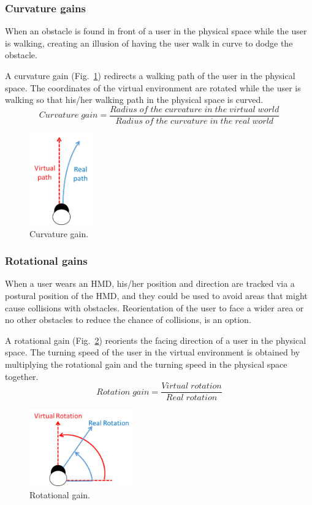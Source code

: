 \subsubsection{Curvature gains}
When an obstacle is found in front of a user in the physical space while the user is walking, creating an illusion of having the user walk in curve to dodge the obstacle.

A curvature gain (Fig.~\ref{fig:CGain}) redirects a walking path of the user in the physical space. The coordinates of the virtual environment are rotated while the user is walking so that his/her walking path in the physical space is curved. 
\[
Curvature\;gain =\frac{ Radius\;of\;the\;curvature\;in\;the\;virtual\;world}{Radius\;of\;the\;curvature\;in\;the\;real\;world}
 \]
\begin{figure}[H]\centering
	\includegraphics[width=0.25\textwidth]{Pictures/CurvatureGain.png}%
	\caption{Curvature gain.}\label{fig:CGain}%
\end{figure}

\subsubsection{Rotational gains}
When a user wears an HMD, his/her position and direction are tracked via a postural position of the HMD, and they could be used to avoid areas that might cause collisions with obstacles. Reorientation of the user to face a wider area or no other obstacles to reduce the chance of collisions, is an option.

A rotational gain (Fig.~\ref{fig:RGain}) reorients the facing direction of a user in the physical space. The turning speed of the user in the virtual environment is obtained by multiplying the rotational gain and the turning speed in the physical space together.
\[
Rotation\;gain =\frac{Virtual\;rotation}{Real\;rotation}
 \]
\begin{figure}[H]\centering
	\includegraphics[width=0.4\textwidth]{Pictures/RotationGain.png}%
	\caption{Rotational gain.}\label{fig:RGain}%
\end{figure}
\newpage
